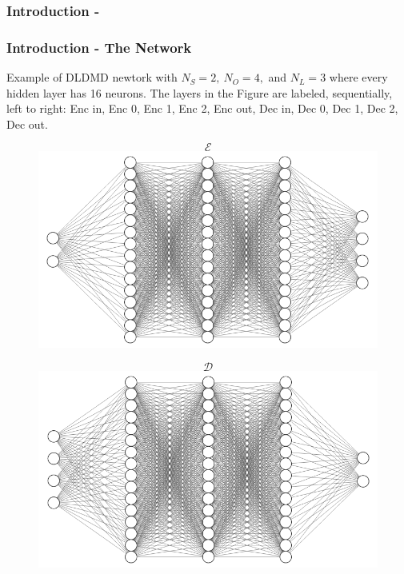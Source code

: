\documentclass[11pt,aspectratio=169]{beamer}
\begin{document}
    \begin{frame}
        \frametitle{Introduction - }

    \end{frame}

    \begin{frame}
        \frametitle{Introduction - The Network}
        Example of DLDMD newtork with $N_S = 2,\ N_O = 4,$ and $N_L = 3$ where every
        hidden layer has 16 neurons. The layers in the Figure are 
        labeled, sequentially, left to right: Enc in, Enc 0, Enc 1, Enc 2, Enc out, Dec in, 
        Dec 0, Dec 1, Dec 2, Dec out.
        \begin{figure}
            \centering
            \begin{minipage}{.5\textwidth}
                $$\mathcal{E}$$
                \includegraphics[width=\textwidth]{../Figures/Encoder.png}
            \end{minipage}%
            \begin{minipage}{.5\textwidth}
                $$\mathcal{D}$$
                \includegraphics[width=\textwidth]{../Figures/Decoder.png}
            \end{minipage}
        \end{figure}
    \end{frame}
\end{document}

